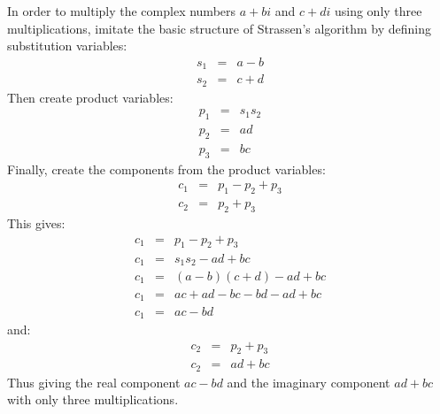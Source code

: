 In order to multiply the complex numbers $a + bi$ and $c + di$ using only three multiplications, imitate the basic structure of Strassen's algorithm by defining substitution variables:
\begin{eqnarray*}
	s_1 & = & a - b \\
	s_2 & = & c + d
\end{eqnarray*}
Then create product variables:
\begin{eqnarray*}
	p_1 & = & s_1 s_2 \\
	p_2 & = & ad \\
	p_3 & = & bc
\end{eqnarray*}
Finally, create the components from the product variables:
\begin{eqnarray*}
	c_1 & = & p_1 - p_2 + p_3 \\
	c_2 & = & p_2 + p_3
\end{eqnarray*}
This gives:
\begin{eqnarray*}
	c_1 & = & p_1 - p_2 + p_3 \\
	c_1 & = & s_1 s_2 - ad + bc \\
	c_1 & = & (a - b)(c + d) - ad + bc \\
	c_1 & = & ac + ad - bc - bd - ad + bc \\
	c_1 & = & ac - bd
\end{eqnarray*}
and:
\begin{eqnarray*}
	c_2 & = & p_2 + p_3 \\
	c_2 & = & ad + bc
\end{eqnarray*}
Thus giving the real component $ac - bd$ and the imaginary component $ad + bc$ with only three multiplications.
